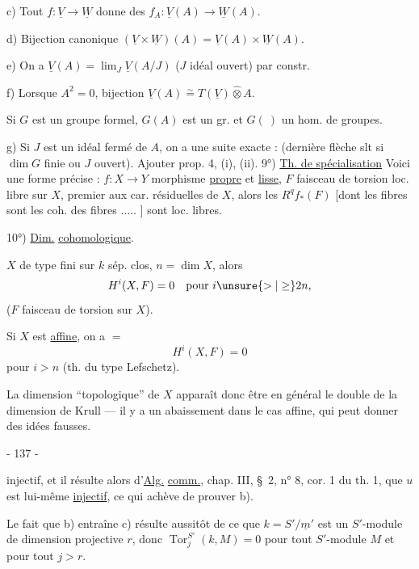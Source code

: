 c) Tout $f:\underline V\longrightarrow\underline W$ donne des $f_A:\underline V(A)\longrightarrow\underline W(A)$.

d) Bijection canonique $(\underline V\times\underline W)(A)=\underline V(A)\times\underline W(A)$.

e) On a $\underline V(A)=\lim_J\underline V(A/J)$ ($J$ idéal ouvert) par constr.

f) Lorsque $A^2=0$, bijection $\underline V(A)\overset{\sim}{=}T(\underline V)\widehat\otimes A$.

Si $G$ est un groupe formel, $G(A)$ est un gr. et $G(\ )$ un hom. de groupes.

g) Si $J$ est un idéal fermé de $A$, on a une suite exacte :
(dernière flèche slt si $\dim G$ finie ou $J$ ouvert). Ajouter prop. 4, (i), (ii).
9°) \uline{Th. de spécialisation} Voici  une forme précise : $f:X\to Y$ morphisme \uline{propre} et \uline{lisse}, $F$ faisceau de torsion loc. libre sur $X$, premier aux car. résiduelles de $X$, alors les $R^qf_*(F)$ [dont les fibres sont les coh. des fibres ..... ] sont loc. libres.

10°) \uline{Dim.} \uline{cohomologique}.

$X$ de type fini sur $k$ sép. clos, $n=\dim X$, alors
\[
H^i(X,F)=0\quad\text{pour }i\unsure{>|\geq}2n,
\]
($F$ faisceau de torsion sur $X$).

Si $X$ est \uline{affine}, on a $=$
\[
H^i(X,F)=0
\]
pour $i>n$ (th. du type Lefschetz).

La dimension ``topologique'' de $X$ apparaît donc  être en général le double de la dimension de Krull --- il y a un abaissement dans le cas affine, qui peut donner des idées fausses.
\begin{center}- 137 -\end{center}

injectif, et il résulte alors d'\uline{Alg.} \uline{comm.}, chap. III, \S\ 2, n° 8, cor. 1 du th. 1, que $u$ est lui-même \uline{injectif}, ce qui achève de prouver b).

Le fait que b) entraîne c) résulte aussitôt de ce que $k=S'/\underline m'$ est un $S'$-module de dimension projective $r$, donc $\operatorname{Tor}^{S'}_j(k,M)=0$ pour tout $S'$-module $M$ et pour tout $j>r$.

